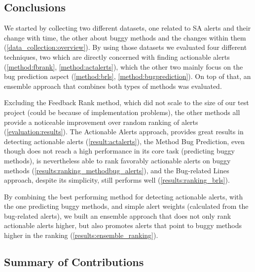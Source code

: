 \subsection{Conclusions}

We started by collecting two different datasets, one related to SA alerts and their change with time, the other about buggy methods and the changes within them (\cref{data_collection:overview}). By using those datasets we evaluated four different techniques, two which are directly concerned with finding actionable alerts (\cref{method:fbrank}, \cref{method:actalerts}), which the other two mainly focus on the bug prediction aspect (\cref{method:brls}, \cref{method:bugprediction}).
On top of that, an ensemble approach that combines both types of methods was evaluated.

Excluding the Feedback Rank method, which did not scale to the size of our test project (could be because of implementation problems), the other methods all provide a noticeable improvement over random ranking of alerts (\cref{evaluation:results}). The Actionable Alerts approach, provides great results in detecting actionable alerts (\cref{result:actalerts}), the Method Bug Prediction, even though does not reach a high performance in its core task (predicting buggy methods), is nevertheless able to rank favorably actionable alerts on buggy methods (\cref{results:ranking_methodbug_alerts}), and the Bug-related Lines approach, despite its simplicity, still performs well (\cref{results:ranking_brls}). 

By combining the best performing method for detecting actionable alerts, with the one predicting buggy methods, and simple alert weights (calculated from the bug-related alerts), we built an ensemble approach that does not only rank actionable alerts higher, but also promotes alerts that point to buggy methods higher in the ranking (\cref{results:ensemble_ranking}).


\subsection{Summary of Contributions}
 
